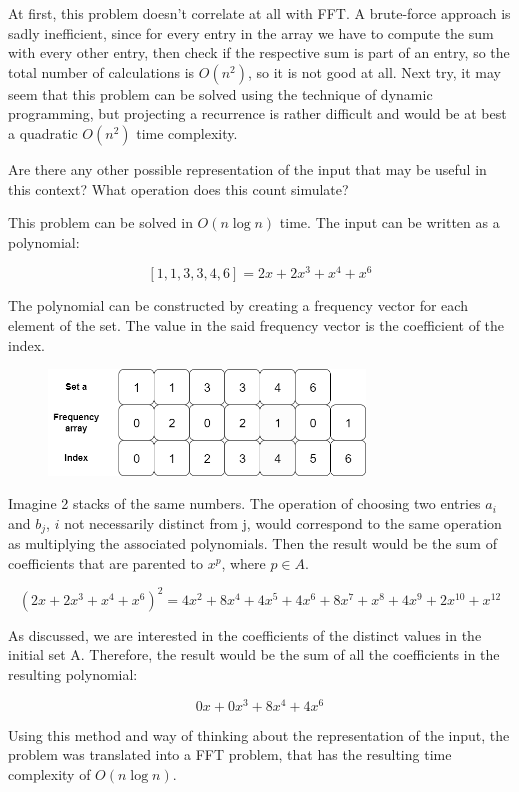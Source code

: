 \documentclass[letterpaper]{article}
\begin{document}
At first, this problem doesn't correlate at all with FFT. A brute-force approach is sadly inefficient, since for every entry in the array we have to compute the sum with every other entry, then check if the respective sum is part of an entry, so the total number of calculations is $O(n^{2})$, so it is not good at all. Next try, it may seem that this problem can be solved using the technique of dynamic programming, but projecting a recurrence is rather difficult and would be at best a quadratic $O(n^{2})$ time complexity.

Are there any other possible representation of the input that may be useful in this context? What operation does this count simulate?

This problem can be solved in $O(n \log n)$ time. The input can be written as a polynomial:

$$
[1, 1, 3, 3, 4, 6] = 2x + 2x^{3} + x^{4} + x^{6}
$$

The polynomial can be constructed by creating a frequency vector for each element of the set. The value in the said frequency vector is the coefficient of the index.

\begin{figure} [h!]
\centering
\includegraphics[width=0.75\textwidth]{pngOfDiagrams/FFTProblem.png}
\end{figure}

Imagine 2 stacks of the same numbers. The operation of choosing two entries $a_{i}$ and $b_{j}$, $i$ not necessarily distinct from j, would correspond to the same operation as multiplying the associated polynomials. Then the result would be the sum of coefficients that are parented to $x^p$, where $p \in {A}$.

$$
(2x + 2x^{3} + x^{4} + x^{6})^2 = 4x^2 + 8x^4 + 4x^5 + 4x^6 + 8x^7 + x^8 + 4x^9 + 2x^{10} + x^{12}
$$

As discussed, we are interested in the coefficients of the distinct values in the initial set A. Therefore, the result would be the sum of all the coefficients in the resulting polynomial:

$$
0x + 0x^{3} + 8x^4 + 4x^6
$$

Using this method and way of thinking about the representation of the input, the problem was translated into a FFT problem, that has the resulting time complexity of $O(n \log n)$.
\end{document}
